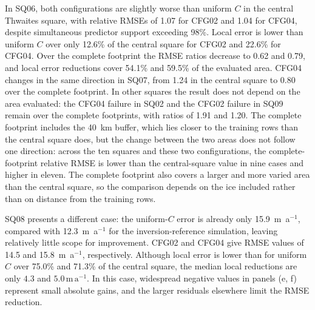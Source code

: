 \documentclass[review,jog]{igs}
\begin{document}
In SQ06, both configurations are slightly worse than uniform \(C\) in the
central Thwaites square, with relative RMSEs of 1.07 for CFG02 and 1.04 for
CFG04, despite simultaneous predictor support exceeding 98\%. Local error is
lower than uniform $C$ over only 12.6\% of the central square for CFG02 and
22.6\% for CFG04. Over the complete footprint the RMSE ratios decrease to 0.62 and
0.79, and local error reductions cover 54.1\% and 59.5\% of the evaluated
area. CFG04 changes in the same direction in SQ07, from 1.24 in the central square to 0.80 over the complete footprint. In other squares the
result does not depend on the area evaluated: the CFG04 failure in SQ02 and
the CFG02 failure in SQ09 remain over the complete footprints, with ratios of
1.91 and 1.20. The complete footprint includes the 40~km buffer, which lies
closer to the training rows than the central square does, but the change
between the two areas does not follow one direction: across the ten squares
and these two configurations, the complete-footprint relative RMSE is lower
than the central-square value in nine cases and higher in eleven. The complete
footprint also covers a larger and more varied area than the central square,
so the comparison depends on the ice included rather than on distance from the training rows.

SQ08 presents a different case: the uniform-$C$ error is already only
15.9~m~a$^{-1}$, compared with 12.3~m~a$^{-1}$ for the inversion-reference
simulation, leaving relatively little scope for improvement. CFG02 and CFG04
give RMSE values of 14.5 and 15.8~m~a$^{-1}$, respectively. Although local
error is lower than for uniform $C$ over 75.0\% and 71.3\% of the central
square, the median local reductions are only $4.3$ and
$5.0\,\mathrm{m\,a^{-1}}$. In this case, widespread negative values in panels
(e, f) represent small absolute gains, and the larger residuals elsewhere limit the RMSE reduction.
\end{document}
